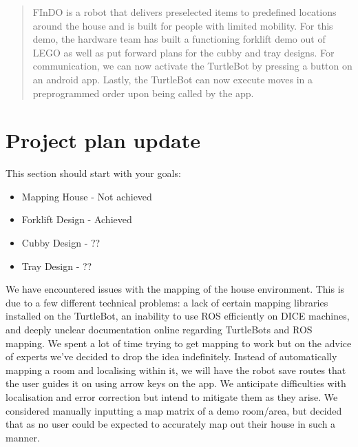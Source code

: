 \documentclass{article}
\begin{document}
 



\begin{abstract} 
FInDO is a robot that delivers preselected items to predefined locations around the house and is built for people with limited mobility. For this demo, the hardware team has built a functioning forklift demo out of LEGO as well as put forward plans for the cubby and tray designs. For communication, we can now activate the TurtleBot by pressing a button on an android app. Lastly, the TurtleBot can now execute moves in a preprogrammed order upon being called by the app.
\end{abstract} 


\section{Project plan update} 

This section should start with your goals:
\begin{itemize}
    \item Mapping House - Not achieved
    \item Forklift Design - Achieved 
    \item Cubby Design - ??
    \item Tray Design - ??
\end{itemize}

We have encountered issues with the mapping of the house environment. This is due to a few different technical problems: a lack of certain mapping libraries installed on the TurtleBot, an inability to use ROS efficiently on DICE machines, and deeply unclear documentation online regarding TurtleBots and ROS mapping. We spent a lot of time trying to get mapping to work but on the advice of experts we've decided to drop the idea indefinitely.
Instead of automatically mapping a room and localising within it, we will have the robot save routes that the user guides it on using arrow keys on the app. We anticipate difficulties with localisation and error correction but intend to mitigate them as they arise. We considered manually inputting a map matrix of a demo room/area, but decided that as no user could be expected to accurately map out their house in such a manner.
\end{document}
